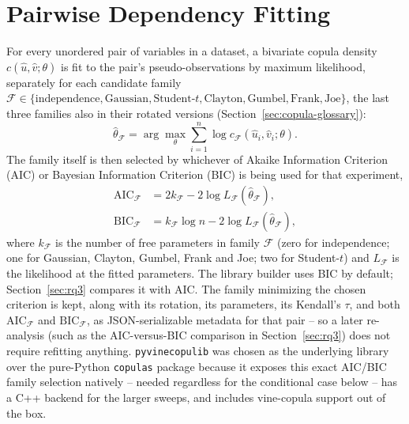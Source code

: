 \documentclass[
  english,
  class=report,
  accentcolor=2c,
  marginpar=false,
  parskip=half-,
  fontsize=11pt,
  ruledheaders=false,
  pdfa=false,
  IMRAD=false,
  thesis={type=master}
]{tudapub}
\begin{document}
\section{Pairwise Dependency Fitting}
\label{sec:pairwise-math}
For every unordered pair of variables in a dataset, a bivariate copula
density $c(\hat{u},\hat{v};\theta)$ is fit to the pair's pseudo-observations
by maximum likelihood, separately for each candidate family $\mathcal{F} \in
\{\text{independence}, \text{Gaussian}, \text{Student-}t, \text{Clayton},
\text{Gumbel}, \text{Frank}, \text{Joe}\}$, the last three families also in
their rotated versions (Section~\ref{sec:copula-glossary}):
\begin{equation}
\hat{\theta}_{\mathcal{F}} = \arg\max_{\theta} \sum_{i=1}^{n} \log
c_{\mathcal{F}}(\hat{u}_i, \hat{v}_i; \theta).
\label{eq:mle}
\end{equation}
The family itself is then selected by whichever of Akaike Information
Criterion (AIC) or Bayesian Information Criterion (BIC) is being used for
that experiment,
\begin{align}
\text{AIC}_{\mathcal{F}} &= 2k_{\mathcal{F}} - 2\log
L_{\mathcal{F}}(\hat{\theta}_{\mathcal{F}}), \\
\text{BIC}_{\mathcal{F}} &= k_{\mathcal{F}} \log n - 2\log
L_{\mathcal{F}}(\hat{\theta}_{\mathcal{F}}),
\label{eq:aicbic}
\end{align}
where $k_{\mathcal{F}}$ is the number of free parameters in family
$\mathcal{F}$ (zero for independence; one for Gaussian, Clayton, Gumbel,
Frank and Joe; two for Student-$t$) and $L_{\mathcal{F}}$ is the
likelihood at the fitted parameters. The library builder uses BIC by
default; Section~\ref{sec:rq3} compares it with AIC. The family minimizing
the chosen criterion is kept, along with its rotation, its parameters, its
Kendall's $\tau$, and
both $\text{AIC}_{\mathcal{F}}$ and $\text{BIC}_{\mathcal{F}}$, as
JSON-serializable metadata for that pair -- so a later re-analysis (such as
the AIC-versus-BIC comparison in Section~\ref{sec:rq3}) does not require
refitting anything. \texttt{pyvinecopulib} was chosen as the underlying
library over the pure-Python \texttt{copulas} package because it exposes
this exact AIC/BIC family selection natively -- needed regardless for the
conditional case below -- has a C++ backend for the larger sweeps, and
includes vine-copula support out of the box.
\end{document}
